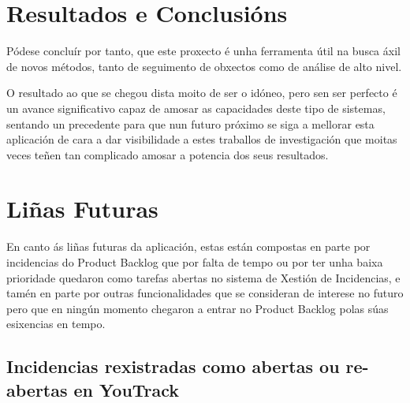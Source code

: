 \chapter{Resultados e Conclusións}

Pódese concluír por tanto, que este proxecto é unha ferramenta útil na busca áxil de novos métodos,
tanto de seguimento de obxectos como de análise de alto nivel.

O resultado ao que se chegou dista moito de ser o idóneo, pero sen ser perfecto é un avance 
significativo capaz de amosar as capacidades deste tipo de sistemas, sentando un precedente para
que nun futuro próximo se siga a mellorar esta aplicación de cara a dar visibilidade a estes 
traballos de investigación que moitas veces teñen tan complicado amosar a potencia dos seus 
resultados.


\chapter{Liñas Futuras}
\label{sec:linhasFuturas}
    En canto ás liñas futuras da aplicación, estas están compostas en parte por incidencias do 
    Product Backlog que por falta de tempo ou por ter unha baixa prioridade quedaron como tarefas 
    abertas no sistema de Xestión de Incidencias, e tamén en parte por outras funcionalidades que se
    consideran de interese no futuro pero que en ningún momento chegaron a entrar no Product Backlog
    polas súas esixencias en tempo.
    
    \section{Incidencias rexistradas como abertas ou re-abertas en YouTrack}
    
